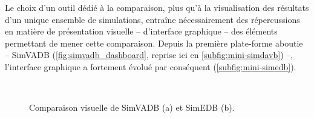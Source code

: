 Le choix d'un outil dédié à la comparaison, plus qu'à la visualisation des résultats d'un unique ensemble de simulations, entraîne nécessairement des répercussions en matière de présentation visuelle -- d'interface graphique -- des éléments permettant de mener cette comparaison.
Depuis la première plate-forme aboutie -- SimVADB (\cref{fig:simvadb_dashboard}, reprise ici en \cref{subfig:mini-simdavb}) --, l'interface graphique a fortement évolué par conséquent (\cref{subfig:mini-simedb}).
\vspace{-0.25cm}
\begin{figure}[H]
	\centering
	\\[-1.5ex]
	\hspace{1pt}
	\vspace{-0.3cm}
	\caption[Comparaison visuelle de SimVADB et SimEDB.]{Comparaison visuelle de SimVADB (a) et SimEDB (b).}
	\label{fig:comparaison-simvadb-simedb}
\end{figure}


